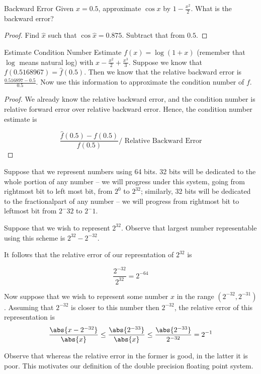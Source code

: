 \documentclass[../main.tex]{subfiles}
\begin{document}
\begin{problem}{Backward Error}
    Given $x = 0.5$, approximate $\cos x$ by $1 - \frac{x^2}{2}$.
    What is the backward error?
\end{problem}

\begin{proof}
    Find $\hat{x}$ such that $\cos \hat{x} = 0.875$. Subtract that
    from $0.5$.
\end{proof}

\begin{problem}{Estimate Condition Number}
    Estimate $f(x) = \log(1 + x)$ (remember that $\log$ means natural
    log) with $x - \frac{x^2}{2} + \frac{x^3}{3}$. Suppose we know that
    $f(0.5168967) = \hat{f}(0.5)$. Then we know that the relative backward
    error is $\frac{0.516897 - 0.5}{0.5}$. Now use this information
    to approximate the condition number of $f$.
\end{problem}

\begin{proof}
    We already know the relative backward error, and the condition number is relative forward error over relative backward error. Hence, the
    condition number estimate is

    \[
        \frac{\hat{f}(0.5) - f(0.5)}{f(0.5)} \bigg/ \text{ Relative Backward Error}
    \]
\end{proof}


\begin{definition}
    Suppose that we represent numbers using 64 bits. 32 bits will be dedicated to the whole portion of any number -- we will progress under this system, going from rightmost bit to left most bit, from $2^0$ to $2^32$; similarly, 32 bits will be dedicated to the fractionalpart of any number -- we will progress from rightmost bit to leftmost bit from $2^-32$ to $2^-1$.
\end{definition}

\begin{remark}
    Suppose that we wish to represent $2^{32}$. Observe that largest number representable using this scheme is $2^{32} - 2^{-32}$.

    It follows that the relative error of our represntation of $2^{32}$ is 

    \[
        \frac{2^{-32}}{2^{32}} = 2^{-64}
    \]

    Now suppose that we wish to represent some number $x$ in the range $(2^{-32}, 2^{-31})$. Assuming that $2^{-32}$ is closer to this
    number then $2^{-32}$, the relative error of this representation is 
    \[
        \frac{\abs{x - 2^{-32}}}{\abs{x}} \leq \frac{\abs{2^{-33}}}{\abs{x}} \leq \frac{\abs{2^{-33}}}{2^{-32}} = 2^{-1}
    \]

    Observe that whereas the relative error in the former is good, in the latter it is poor. This motivates our definition of the
    double precision floating point system.
\end{remark}
\end{document}

